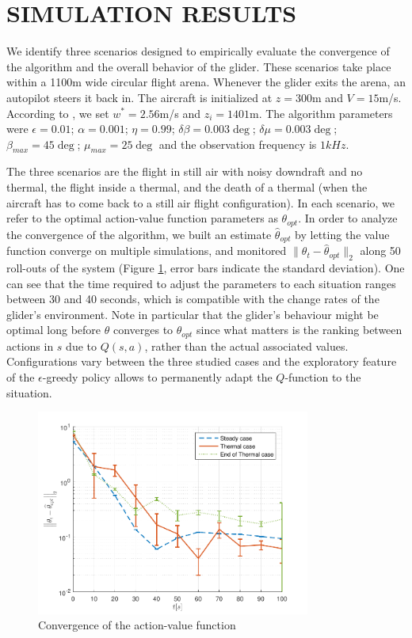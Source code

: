 \documentclass{jfpda}
\begin{document}
\section{SIMULATION RESULTS}
\label{sec:results}

We identify three scenarios designed to empirically evaluate the convergence of the algorithm and the overall behavior of the glider. These scenarios take place within a 1100m wide circular flight arena. Whenever the glider exits the arena, an autopilot steers it back in. The aircraft is initialized at $z=300$m and $V=15$m/s. According to \cite{allen_thermal}, we set $w^*=2.56$m/s and $z_i=1401$m. The algorithm parameters were $\epsilon = 0.01$; $\alpha = 0.001$; $\eta = 0.99$; $\delta \beta = 0.003\deg$; $\delta \mu = 0.003\deg$; $\beta_{max} = 45\deg$; $\mu_{max} = 25\deg$ and the observation frequency is $1kHz$. 

The three scenarios are the flight in still air with noisy downdraft and no thermal, the flight inside a thermal, and the death of a thermal (when the aircraft has to come back to a still air flight configuration).
In each scenario, we refer to the optimal action-value function parameters as $\theta_{opt}$.
In order to analyze the convergence of the algorithm, we built an estimate $\widehat{\theta}_{opt}$ by letting the value function converge on multiple simulations, and monitored $\|\theta_t - \widehat{\theta}_{opt}\|_2$ along 50 roll-outs of the system (Figure \ref{fig:param_cv}, error bars indicate the standard deviation). One can see that the time required to adjust the parameters to each situation ranges between 30 and 40 seconds, which is compatible with the change rates of the glider's environment. Note in particular that the glider's behaviour might be optimal long before $\theta$ converges to $\theta_{opt}$ since what matters is the ranking between actions in $s$ due to $Q(s,a)$, rather than the actual associated values. Configurations vary between the three studied cases and the exploratory feature of the $\epsilon$-greedy policy allows to permanently adapt the $Q$-function to the situation.

\begin{figure}
\begin{center}
 \includegraphics[width=9cm]{img/cv_speed.pdf}
\end{center}
\caption{Convergence of the action-value function}
\label{fig:param_cv}
\end{figure}
\end{document}
